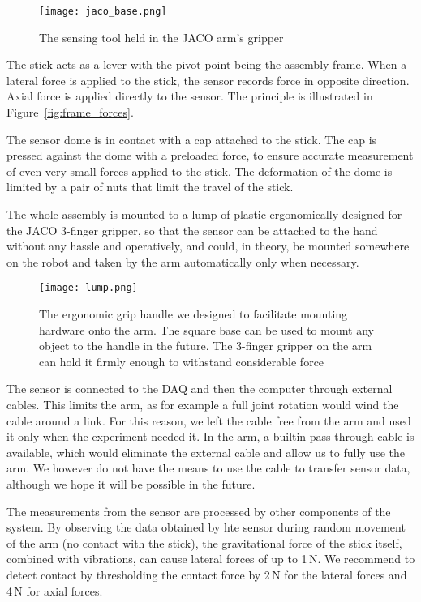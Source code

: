 \documentclass[buriama8_dp.tex]{subfiles}
\begin{document}
\begin{figure}[htp]
  \centering
  \texttt{[image: jaco\_base.png]}
  \caption[Sensing tool]{The sensing tool held in the JACO arm's gripper}
  \label{fig:tool_photo} 
\end{figure}

The stick acts as a lever with the pivot point being the assembly frame. When a lateral force is applied to the stick, the sensor records force in opposite direction. Axial force is applied directly to the sensor. The principle is illustrated in Figure~\ref{fig:frame_forces}.

The sensor dome is in contact with a cap attached to the stick. The cap is pressed against the dome with a preloaded force, to ensure accurate measurement of even very small forces applied to the stick. The deformation of the dome is limited by a pair of nuts that limit the travel of the stick.

The whole assembly is mounted to a lump of plastic ergonomically designed for the JACO 3-finger gripper, so that the sensor can be attached to the hand without any hassle and operatively, and could, in theory, be mounted somewhere on the robot and taken by the arm automatically only when necessary.

\begin{figure}[ht]
  \centering
  \texttt{[image: lump.png]}
  \caption[Tool grip handle]{The ergonomic grip handle we designed to facilitate mounting hardware onto the arm. The square base can be used to mount any object to the handle in the future. The 3-finger gripper on the arm can hold it firmly enough to withstand considerable force}
  \label{fig:label}
\end{figure}

The sensor is connected to the DAQ and then the computer through external cables. This limits the arm, as for example a full joint rotation would wind the cable around a link. For this reason, we left the cable free from the arm and used it only when the experiment needed it. In the arm, a builtin pass-through cable is available, which would eliminate the external cable and allow us to fully use the arm. We however do not have the means to use the cable to transfer sensor data, although we hope it will be possible in the future.

The measurements from the sensor are processed by other components of the system. By observing the data obtained by hte sensor during random movement of the arm (no contact with the stick), the gravitational force of the stick itself, combined with vibrations, can cause lateral forces of up to 1\,N. We recommend to detect contact by thresholding the contact force by 2\,N for the lateral forces and 4\,N for axial forces.
\end{document}
